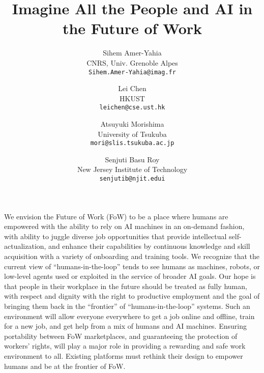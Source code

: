 \documentclass[11pt]{article}
\begin{document}
\title{Imagine All the People and AI in the Future of Work}
\author{Sihem Amer-Yahia\\
 CNRS, Univ. Grenoble Alpes\\
\texttt{{\footnotesize Sihem.Amer-Yahia@imag.fr}}
\and
Lei Chen\\
HKUST\\
\texttt{{\footnotesize leichen@cse.ust.hk}}
\and
Atsuyuki Morishima\\
University of Tsukuba\\
\texttt{{\footnotesize mori@slis.tsukuba.ac.jp}}
\and
Senjuti Basu Roy\\
New Jersey Institute of Technology\\
\texttt{{\footnotesize senjutib@njit.edui\\}}
}
\maketitle

We envision the Future of Work (FoW) to be a place where humans are empowered with the ability to rely on AI machines in an on-demand fashion, with ability to juggle diverse job opportunities that provide intellectual self-actualization, and enhance their capabilities by continuous knowledge and skill acquisition with a variety of onboarding and training tools. We recognize that the current view of ``humans-in-the-loop'' tends to see humans as machines, robots, or low-level agents used or exploited in the service of broader AI goals. Our hope is that people in their workplace in the future should be treated as fully human, with respect and dignity with the right to productive employment and the goal of bringing them back in the ``frontier'' of ``humans-in-the-loop'' systems. Such an environment will allow everyone everywhere to get a job online and offline, train for a new job, and get help from a mix of humans and AI machines. Ensuring portability between FoW marketplaces, and guaranteeing the protection of workers' rights, will play a major role in providing a rewarding and safe work environment to all. Existing platforms must rethink their design to empower humans and be at the frontier of FoW.
\end{document}
